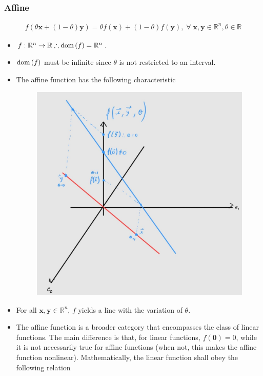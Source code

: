 \documentclass{article}
\newcommand{\dom}[1]{\ensuremath{\textnormal{dom}\left(#1\right)}} %
\begin{document}
\subsubsection{Affine}
\begin{align}
    f(\theta \mathbf{x} + (1-\theta)\mathbf{y}) = \theta f(\mathbf{x}) + (1-\theta)f(\mathbf{y}),\;\forall\; \mathbf{x}, \mathbf{y} \in \mathbb{R}^{n}, \theta\in\mathbb{R}
\end{align}
\begin{itemize}
    \item \(f: \mathbb{R}^{n} \rightarrow \mathbb{R} \therefore \dom{f} = \mathbb{R}^{n}\).
    \item \(\dom{f}\) must be infinite since \(\theta\) is not restricted to an interval.
    \item The affine function has the following characteristic
    \begin{figure}[H]
        \centering
        \includegraphics[scale=.2]{figs/affine.png}
    \end{figure}
    \item For all \(\mathbf{x}, \mathbf{y} \in \mathbb{R}^{n}\), \(f\) yields a line with the variation of \(\theta\).
    \item The affine function is a broader category that encompasses the class of linear functions. The main difference is that, for linear functions, \(f(\mathbf{0}) = 0\), while it is not necessarily true for affine functions (when not, this makes the affine function nonlinear). Mathematically, the linear function shall obey the following relation

\end{itemize}
\end{document}
